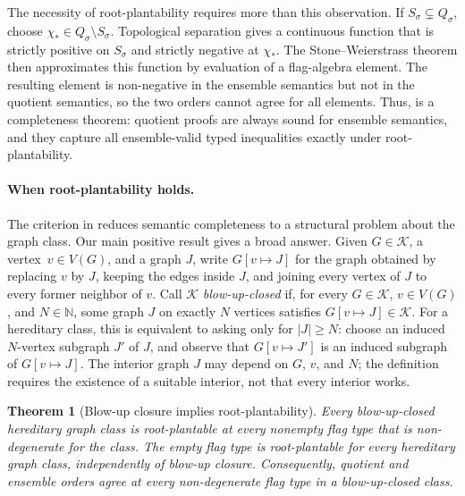 \documentclass{article}
\newtheorem{theorem}{Theorem}[section]
\begin{document}
The necessity of root-plantability requires more than this observation.  If
\(S_\sigma\subsetneq Q_\sigma\), choose
\(\chi_*\in Q_\sigma\setminus S_\sigma\).  Topological separation gives a
continuous function that is strictly positive on \(S_\sigma\) and strictly
negative at \(\chi_*\).  The Stone--Weierstrass theorem then approximates this
function by evaluation of a flag-algebra element.  The resulting element is
non-negative in the ensemble semantics but not in the quotient semantics,
so the two orders
cannot agree for all elements.  Thus,  is a completeness theorem:
quotient proofs are always sound for ensemble semantics, and they capture all
ensemble-valid typed inequalities exactly under root-plantability.

\paragraph{When root-plantability holds.}
The criterion in  reduces semantic completeness to a structural problem about the
graph class.  Our main positive result gives a broad answer.  Given
\(G\in\mathcal K\), a vertex~\(v\in V(G)\), and a graph \(J\), write
\(G[v\mapsto J]\) for the graph obtained by replacing \(v\) by \(J\), keeping
the edges inside \(J\), and joining every vertex of \(J\) to every former
neighbor of \(v\).  Call \(\mathcal K\) \emph{blow-up-closed} if, for every
\(G\in\mathcal K\), \(v\in V(G)\), and \(N \in \mathbb{N}\), some graph \(J\) on exactly
\(N\) vertices satisfies \(G[v\mapsto J]\in\mathcal K\).  For a hereditary
class, this is equivalent to asking only for \(\lvert J\rvert\geq N\):
choose an induced \(N\)-vertex subgraph \(J'\) of \(J\), and observe that
\(G[v\mapsto J']\) is an induced subgraph of \(G[v\mapsto J]\).  The interior
graph \(J\) may depend on \(G\), \(v\), and \(N\); the definition requires the
existence of a suitable interior, not that every interior works.

\begin{theorem}[Blow-up closure implies root-plantability]
\label{thm:blowup-root-plantability-summary}
Every blow-up-closed hereditary graph class is root-plantable at every
nonempty flag type that is non-degenerate for the class.  The empty flag type is
root-plantable for every hereditary graph class, independently of blow-up
closure.  Consequently, quotient and ensemble orders agree at every
non-degenerate flag type in a blow-up-closed class.
\end{theorem}
\end{document}
